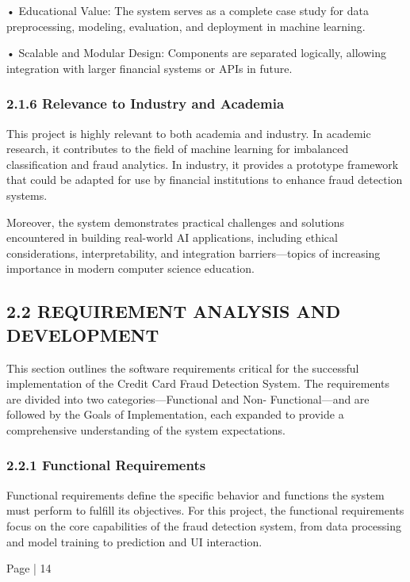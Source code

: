 \documentclass[11pt,a4paper]{article}
\begin{document}
• 
Educational Value: The system serves as a complete case study for data preprocessing, modeling, 
evaluation, and deployment in machine learning. 

• 
Scalable and Modular Design: Components are separated logically, allowing integration with 
larger financial systems or APIs in future. 

\subsubsection*{2.1.6 Relevance to Industry and Academia }

This project is highly relevant to both academia and industry. In academic research, it contributes to the field 
of machine learning for imbalanced classification and fraud analytics. In industry, it provides a prototype 
framework that could be adapted for use by financial institutions to enhance fraud detection systems. 

Moreover, the system demonstrates practical challenges and solutions encountered in building real-world AI 
applications, including ethical considerations, interpretability, and integration barriers—topics of increasing 
importance in modern computer science education. 

\subsection*{2.2 REQUIREMENT ANALYSIS AND DEVELOPMENT }

This section outlines the software requirements critical for the successful implementation of the Credit Card 
Fraud Detection System. The requirements are divided into two categories—Functional and Non-
Functional—and are followed by the Goals of Implementation, each expanded to provide a comprehensive 
understanding of the system expectations. 

\subsubsection*{2.2.1 Functional Requirements }

Functional requirements define the specific behavior and functions the system must perform to fulfill its 
objectives. For this project, the functional requirements focus on the core capabilities of the fraud detection 
system, from data processing and model training to prediction and UI interaction. 

Page | 14  
\end{document}

